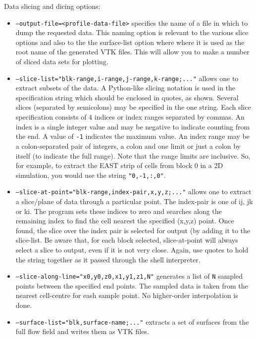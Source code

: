 Data slicing and dicing options:
\begin{itemize}
  \item \texttt{--output-file=<profile-data-file>} specifies the name of a file in which to dump the requested data.
     This naming option is relevant to the various slice options and also to the the surface-list option where
     where it is used as the root name of the generated VTK files.
     This will allow you to make a number of sliced data sets for plotting.
  \item \texttt{--slice-list="blk-range,i-range,j-range,k-range;..."} allows one to extract subsets of the data.
     A Python-like slicing notation is used in the specification string which should be enclosed in quotes, as shown. 
     Several slices (separated by semicolons) may be specified in the one string.
     Each slice specification consists of 4 indices or index ranges separated by commas.  
     An index is a single integer value and may be negative to indicate counting from the end.
     A value of \texttt{-1} indicates the maximum value.
     An index range may be a colon-separated pair of integers, a colon and one limit 
     or just a colon by itself (to indicate the full range).
     Note that the range limits are inclusive.
     So, for example, to extract the EAST strip of cells from block 0 in a 2D simulation, you would use
     the string \texttt{"0,-1,:,0"}.
  \item \texttt{--slice-at-point="blk-range,index-pair,x,y,z;..."} allows one to extract a slice/plane of data
     through a particular point.
     The index-pair is one of ij, jk or ki.  
     The program sets these indices to zero and searches along the remaining index to find the cell nearest 
     the specified (x,y,z) point.
     Once found, the slice over the index pair is selected for output (by adding it to the slice-list.
     Be aware that, for each block selected, slice-at-point will always select a slice to output, 
     even if it is not very close.
     Again, use quotes to hold the string together as it passed through the shell interpreter.
  \item \texttt{--slice-along-line="x0,y0,z0,x1,y1,z1,N"} generates a list of \texttt{N} sampled points between
     the specified end points.
     The sampled data is taken from the nearest cell-centre for eash sample point.
     No higher-order interpolation is done.
  \item \texttt{--surface-list="blk,surface-name;..."} extracts a set of surfaces from the full flow field and 
     writes them as VTK files.  

\end{itemize}
